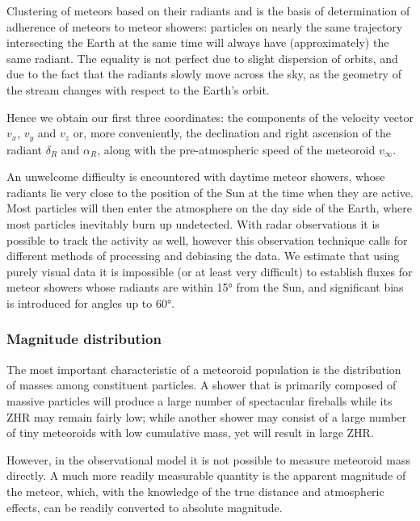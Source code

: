            Clustering of meteors based on their radiants and is the basis of determination of
            adherence of meteors to meteor showers: particles on nearly the same trajectory intersecting
            the Earth at the same time will always have (approximately) the same radiant.
            The equality is not perfect due to slight dispersion of orbits,
            and due to the fact that the radiants slowly move across the sky,
            as the geometry of the stream changes with respect to the Earth's orbit.

            Hence we obtain our first three coordinates: the components of the velocity vector $v_x$, $v_y$ and $v_z$
            or, more conveniently, the declination and right ascension of the radiant $\delta_R$ and $\alpha_R$,
            along with the pre-atmospheric speed of the meteoroid $v_\infty$.

            An unwelcome difficulty is encountered with daytime meteor showers, whose radiants
            lie very close to the position of the Sun at the time when they are active.
            Most particles will then enter the atmosphere on the day side
            of the Earth, where most particles inevitably burn up undetected.
            With radar observations it is possible to track the activity as well,
            however this observation technique calls for different methods of processing and debiasing the data.
            We estimate that using purely visual data it is impossible (or at least very difficult) to establish fluxes
            for meteor showers whose radiants are within \ang{15} from the Sun, and significant bias
            is introduced for angles up to \ang{60}.

        \subsubsection{Magnitude distribution} \label{mspm}
            The most important characteristic of a meteoroid population is the distribution of masses
            among constituent particles. A shower that is primarily composed of massive particles
            will produce a large number of spectacular fireballs while its ZHR may remain fairly low;
            while another shower may consist of a large number of tiny meteoroids with low cumulative mass,
            yet will result in large ZHR.

            However, in the observational model it is not possible to measure meteoroid mass directly.
            A much more readily measurable quantity is the apparent magnitude of the meteor, which,
            with the knowledge of the true distance and atmospheric effects, can be readily converted
            to absolute magnitude.

